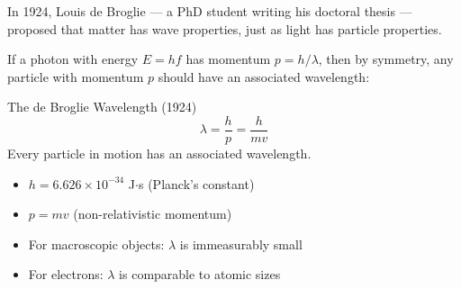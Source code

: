 \documentclass[12pt, a4paper]{book}
\begin{document}
In 1924, Louis de Broglie --- a PhD student writing his
doctoral thesis --- proposed that matter has wave properties,
just as light has particle properties.

If a photon with energy $E = hf$ has momentum $p = h/\lambda$,
then by symmetry, any particle with momentum $p$ should have
an associated wavelength:

\begin{namedconcept}{The de Broglie Wavelength (1924)}
\[
  \lambda = \frac{h}{p} = \frac{h}{mv}
\]
Every particle in motion has an associated wavelength.
\begin{itemize}[nosep, leftmargin=2em]
  \item $h = 6.626\times10^{-34}$ J$\cdot$s (Planck's constant)
  \item $p = mv$ (non-relativistic momentum)
  \item For macroscopic objects: $\lambda$ is immeasurably small
  \item For electrons: $\lambda$ is comparable to atomic sizes
\end{itemize}
\end{namedconcept}
\end{document}
